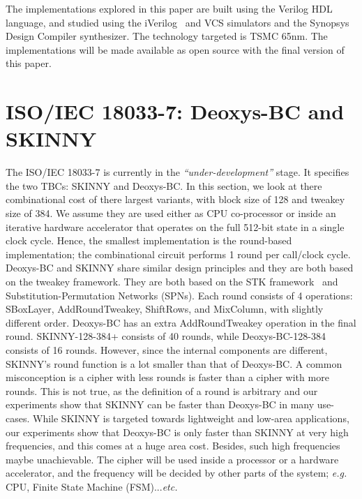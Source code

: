 \documentclass[conference]{IEEEtran}
\begin{document}
The implementations explored in this paper are built using the Verilog HDL language, and studied using the iVerilog~\cite{iverilog} and VCS simulators and the Synopsys Design Compiler synthesizer. The technology targeted is TSMC 65nm. The implementations will be made available as open source with the final version of this paper.

\section{ISO/IEC 18033-7: Deoxys-BC and SKINNY}\label{sec:tbc}

The ISO/IEC 18033-7 is currently in the {\it ``under-development''} stage. It specifies the two TBCs: SKINNY and Deoxys-BC. In this section, we look at there combinational cost of there largest variants, with block size of 128 and tweakey size of 384. We assume they are used either as CPU co-processor or inside an iterative hardware accelerator that operates on the full 512-bit state in a single clock cycle. Hence, the smallest implementation is the round-based implementation; the combinational circuit performs 1 round per call/clock cycle. Deoxys-BC and SKINNY share similar design principles and they are both based on the tweakey framework. They are both based on the STK framework~\cite{jean2014tweaks} and Substitution-Permutation Networks (SPNs). Each round consists of 4 operations: SBoxLayer, AddRoundTweakey, ShiftRows, and MixColumn, with slightly different order. Deoxys-BC has an extra AddRoundTweakey operation in the final round. SKINNY-128-384+ consists of 40 rounds, while Deoxys-BC-128-384 consists of 16 rounds. However, since the internal components are different, SKINNY's round function is a lot smaller than that of Deoxys-BC. A common misconception is a cipher with less rounds is faster than a cipher with more rounds. This is not true, as the definition of a round is arbitrary and our experiments show that SKINNY can be faster than Deoxys-BC in many use-cases. While SKINNY is targeted towards lightweight and low-area applications, our experiments show that Deoxys-BC is only faster than SKINNY at very high frequencies, and this comes at a huge area cost. Besides, such high frequencies maybe unachievable. The cipher will be used inside a processor or a hardware accelerator, and the frequency will be decided by other parts of the system; {\it e.g.} CPU, Finite State Machine (FSM)...{\it etc.}
\end{document}
